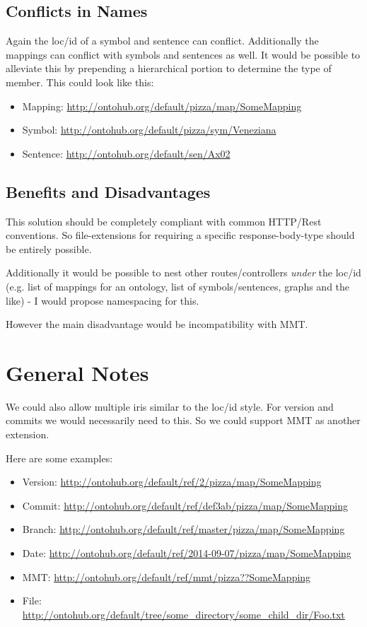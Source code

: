 \documentclass[a4paper,11pt,DIV=25]{scrartcl}
\begin{document}
\subsection{Conflicts in Names}

Again the loc/id of a symbol and sentence can conflict. Additionally the
mappings can conflict with symbols and sentences as well. It would be possible
to alleviate this by prepending a hierarchical portion to determine the type of
member. This could look like this:

\begin{itemize}
  \item Mapping: \url{http://ontohub.org/default/pizza/map/SomeMapping}
  \item Symbol: \url{http://ontohub.org/default/pizza/sym/Veneziana}
  \item Sentence: \url{http://ontohub.org/default/sen/Ax02}
\end{itemize}

\subsection{Benefits and Disadvantages}

This solution should be completely compliant with common HTTP/Rest conventions.
So file-extensions for requiring a specific response-body-type should be
entirely possible.

Additionally it would be possible to nest other routes/controllers
\textit{under} the loc/id (e.g. list of mappings for an ontology, list of
symbols/sentences, graphs and the like) - I would propose namespacing for this.

However the main disadvantage would be incompatibility with MMT.

\pagebreak

\section{General Notes}

We could also allow multiple iris similar to the loc/id style. For version and
commits we would necessarily need to this. So we could support MMT as another
extension.

Here are some examples:

\begin{itemize}
  \item Version: \url{http://ontohub.org/default/ref/2/pizza/map/SomeMapping}
  \item Commit: \url{http://ontohub.org/default/ref/def3ab/pizza/map/SomeMapping}
  \item Branch: \url{http://ontohub.org/default/ref/master/pizza/map/SomeMapping}
  \item Date: \url{http://ontohub.org/default/ref/2014-09-07/pizza/map/SomeMapping}
  \item MMT: \url{http://ontohub.org/default/ref/mmt/pizza??SomeMapping}
  \item File: \url{http://ontohub.org/default/tree/some_directory/some_child_dir/Foo.txt}
\end{itemize}
\end{document}
